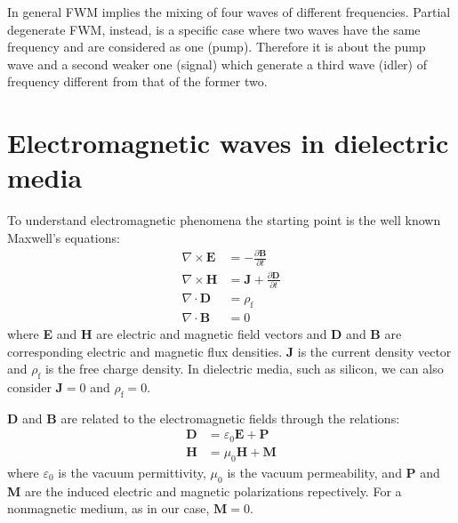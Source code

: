 \documentclass[12pt,a4paper,twoside]{article}
\begin{document}
In general FWM implies the mixing of four waves of different frequencies.
Partial degenerate FWM, instead, is a specific case where two waves have the same frequency and are considered as one (pump).
Therefore it is about the pump wave and a second weaker one (signal) which generate a third wave (idler) of frequency different from that of the former two.

\clearpage
\section{Electromagnetic waves in dielectric media}

To understand electromagnetic phenomena the starting point is the well known Maxwell's equations:
\begin{subequations}
\begin{align}
	\nabla \times \textbf{E} &= -\frac{\partial \textbf{B}}{\partial t}
		\label{eq_maxwell_a} \\
	\nabla \times \textbf{H} &= \textbf{J} + \frac{\partial \textbf{D}}{\partial t}
		\label{eq_maxwell_b} \\
	\nabla \cdot \textbf{D} &= \rho_{\mathrm{f}} 
		\label{eq_maxwell_c} \\
	\nabla \cdot \textbf{B} &= 0
		\label{eq_maxwell_d}
\end{align}
\end{subequations}
where \textbf{E} and \textbf{H} are electric and magnetic field vectors and \textbf{D} and \textbf{B} are corresponding electric and magnetic flux densities. \textbf{J} is the current density vector and $\rho_{\mathrm{f}}$ is the free charge density.
In dielectric media, such as silicon, we can also consider $\textbf{J} = 0$ and $\rho_\mathrm{f} = 0$.

\textbf{D} and \textbf{B} are related to the electromagnetic fields through the relations:
\begin{subequations}
\begin{align}
	\textbf{D} &= \varepsilon_0 \textbf{E} + \textbf{P} \\
	\textbf{H} &= \mu_0 \textbf{H} + \textbf{M}	
\end{align}
\end{subequations}
where $\varepsilon_0$ is the vacuum permittivity, $\mu_0$ is the vacuum permeability, and \textbf{P} and \textbf{M} are the induced electric and magnetic polarizations repectively.
For a nonmagnetic medium, as in our case, $\textbf{M} = 0$.
\end{document}
